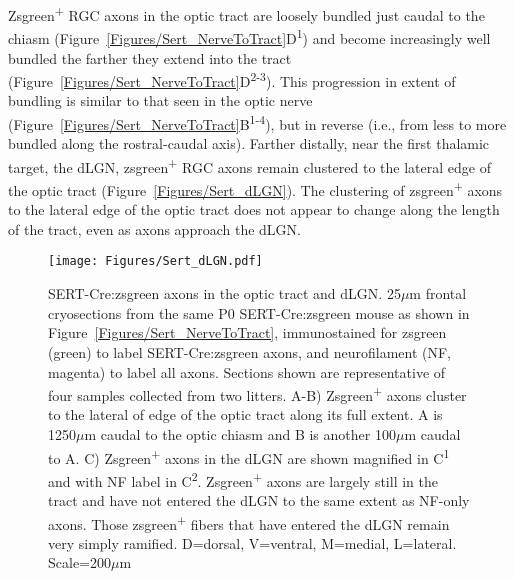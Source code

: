 Zsgreen\textsuperscript{+} RGC axons in the optic tract are loosely bundled just caudal to the chiasm (Figure~\ref{Figures/Sert_NerveToTract}D\textsuperscript{1}) and become increasingly well bundled the farther they extend into the tract (Figure~\ref{Figures/Sert_NerveToTract}D\textsuperscript{2-3}).
This progression in extent of bundling is similar to that seen in the optic nerve (Figure~\ref{Figures/Sert_NerveToTract}B\textsuperscript{1-4}), but in reverse (i.e., from less to more bundled along the rostral-caudal axis).
Farther distally, near the first thalamic target, the dLGN, zsgreen\textsuperscript{+} RGC axons remain clustered to the lateral edge of the optic tract (Figure~\ref{Figures/Sert_dLGN}).
The clustering of zsgreen\textsuperscript{+} axons to the lateral edge of the optic tract does not appear to change along the length of the tract, even as axons approach the dLGN.

\begin{figure}[hbtp]
	\begin{center}
		\texttt{[image: Figures/Sert\_dLGN.pdf]}
		\caption[SERT-Cre:zsgreen axons in the optic tract and dLGN.]
		{SERT-Cre:zsgreen axons in the optic tract and dLGN.
		25$\mu$m frontal cryosections from the same P0 SERT-Cre:zsgreen mouse as shown in Figure~\ref{Figures/Sert_NerveToTract}, immunostained for zsgreen (green) to label SERT-Cre:zsgreen axons, and neurofilament (NF, magenta) to label all axons.
		Sections shown are representative of four samples collected from two litters. %
		A-B) Zsgreen\textsuperscript{+} axons cluster to the lateral of edge of the optic tract along its full extent. 
		A is 1250$\mu$m caudal to the optic chiasm and B is another 100$\mu$m caudal to A.
		C) Zsgreen\textsuperscript{+} axons in the dLGN are shown magnified in C\textsuperscript{1} and with NF label in C\textsuperscript{2}.
		Zsgreen\textsuperscript{+} axons are largely still in the tract and have not entered the dLGN to the same extent as NF-only axons.
		Those zsgreen\textsuperscript{+} fibers that have entered the dLGN remain very simply ramified.
		D=dorsal, V=ventral, M=medial, L=lateral. Scale=200$\mu$m}
		\label{Figures/SertdLGN}
	\end{center}
\end{figure}